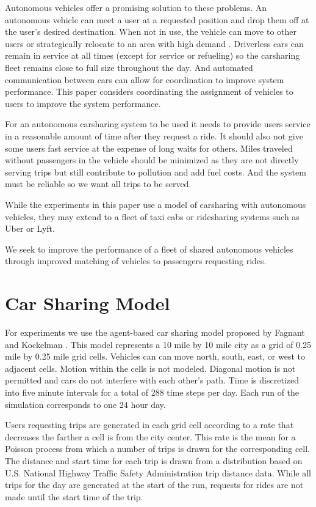 \documentclass[letterpaper]{article}
\begin{document}
Autonomous vehicles offer a promising solution to these problems. An autonomous vehicle can meet a user at a requested position and drop them off at the user's desired destination. When not in use, the vehicle can move to other users or strategically relocate to an area with high demand \cite{fagnant2014travel}. Driverless cars can remain in service at all times (except for service or refueling) so the carsharing fleet remains close to full size throughout the day. And automated communication between cars can allow for coordination to improve system performance. This paper considers coordinating the assignment of vehicles to users to improve the system performance.

For an autonomous carsharing system to be used it needs to provide users service in a reasonable amount of time after they request a ride. It should also not give some users fast service at the expense of long waits for others. Miles traveled without passengers in the vehicle should be minimized as they are not directly serving trips but still contribute to pollution and add fuel costs. And the system must be reliable so we want all trips to be served.


While the experiments in this paper use a model of carsharing with autonomous vehicles, they may extend to a fleet of taxi cabs or ridesharing systems such as Uber or Lyft.

We seek to improve the performance of a fleet of shared autonomous vehicles through improved matching of vehicles to passengers requesting rides. 

\section{Car Sharing Model}

For experiments we use the agent-based car sharing model proposed by Fagnant and Kockelman \cite{fagnant2014travel}. This model represents a 10 mile by 10 mile city as a grid of 0.25 mile by 0.25 mile grid cells. Vehicles can can move north, south, east, or west to adjacent cells. Motion within the cells is not modeled. Diagonal motion is not permitted and cars do not interfere with each other's path. Time is discretized into five minute intervals for a total of 288 time steps per day. Each run of the simulation corresponds to one 24 hour day.

Users requesting trips are generated in each grid cell according to a rate that decreases the farther a cell is from the city center. This rate is the mean for a Poisson process from which a number of trips is drawn for the corresponding cell. The distance and start time for each trip is drawn from a distribution based on U.S. National Highway Traffic Safety Administration trip distance data. While all trips for the day are generated at the start of the run, requests for rides are not made until the start time of the trip. 
\end{document}
